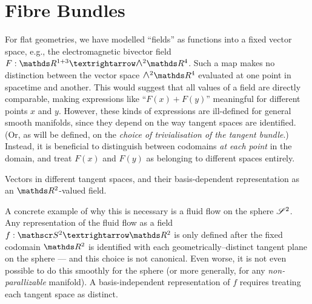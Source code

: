 \section{Fibre Bundles}
\label{cha:fibre-bundles}


For flat geometries, we have modelled ``fields'' as functions into a fixed vector space, e.g., the electromagnetic bivector field $F : \RR^{1+3} → \EA[2]{\RR^4}$.
Such a map makes no distinction between the vector space $\EA[2]{\RR^4}$ evaluated at one point in spacetime and another.
This would suggest that all values of a field are directly comparable, making expressions like ``$F(x) + F(y)$'' meaningful for different points $x$ and $y$.
However, these kinds of expressions are ill-defined for general smooth manifolds, since they depend on the way tangent spaces are identified.
(Or, as will be defined, on the \emph{choice of trivialisation of the tangent bundle}.)
Instead, it is beneficial to distinguish between codomains \emph{at each point} in the domain, and treat $F(x)$ and $F(y)$ as belonging to different spaces entirely.

\begin{marginfigure}
	\centering
	\caption{
		Vectors in different tangent spaces, and their basis-dependent representation as an $\RR^2$-valued field.
	}
	\label{fig:ball}
\end{marginfigure}

A concrete example of why this is necessary is a fluid flow on the sphere $\mathscr{S}^2$.
Any representation of the fluid flow as a field $f : \Sphere^2 → \RR^2$ is only defined after the fixed codomain $\RR^2$ is identified with each geometrically--distinct tangent plane on the sphere --- and this choice is not canonical.
Even worse, it is not even possible to do this smoothly for the sphere (or more generally, for any \emph{non-parallizable} manifold).
A basis-independent representation of $f$ requires treating each tangent space as distinct.

